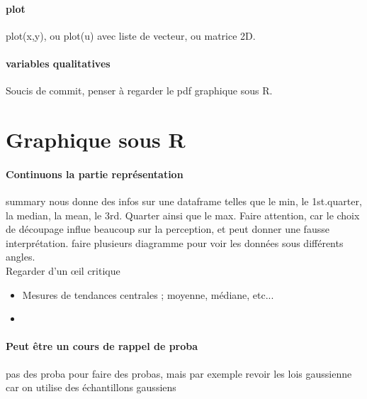 \documentclass{article}
\begin{document}
\paragraph{plot}
 plot(x,y), ou plot(u) avec liste de vecteur, ou matrice 2D.
\paragraph{variables qualitatives} 
Soucis de commit, penser à regarder le pdf graphique sous R.

\section{Graphique sous R}
\begin{center}
\date{6 Février 2013}
\end{center}
\paragraph{Continuons la partie représentation}
summary nous donne des infos sur une dataframe telles que le min, le 1st.quarter, la median, la mean, le 3rd. Quarter ainsi que le max. Faire attention, car le choix de découpage influe beaucoup sur la perception, et peut donner une fausse interprétation. faire plusieurs diagramme pour voir les données sous différents angles.\\Regarder d'un œil critique
\begin{itemize}
\item Mesures de tendances centrales ; moyenne, médiane, etc...
\item 
\end{itemize}
\paragraph{Peut être un cours de rappel de proba}
pas des proba pour faire des probas, mais par exemple revoir les lois gaussienne car on utilise des échantillons gaussiens 
\end{document}
